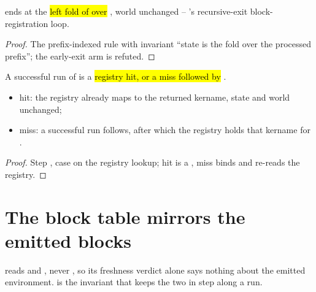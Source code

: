 \begin{lemma}
\label{lem:Erasure-run_modify_forIn_ok}
\leanok
{}
  ends at the \hl{left fold of  over
}, world unchanged -- 's recursive-exit block-registration loop.
\end{lemma}
\begin{proof}
\leanok
{}
 The prefix-indexed  rule with invariant ``state is the fold over the processed
prefix''; the early-exit arm is refuted.
\end{proof}

\begin{lemma}
\label{lem:Erasure-run_get_constant_kername_ok}
\leanok
{}
 A successful run of  is a \hl{registry hit, or a miss
followed by }.
\begin{itemize}
\item hit: the registry already maps  to the returned kername, state and world unchanged;
\item miss: a successful  run follows, after which the registry holds that
kername for .
\end{itemize}
\end{lemma}
\begin{proof}
\leanok
{}
 Step , case on the registry lookup; hit is a , miss binds
 and re-reads the registry.
\end{proof}

\section{The block table mirrors the emitted blocks}
\label{sec:run:indblocks}

 reads  and , never
, so its freshness verdict alone says nothing about the emitted environment.
 is the invariant that keeps the two in step along a run.

